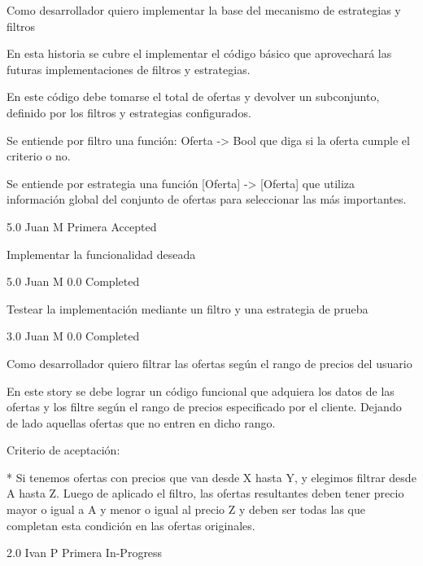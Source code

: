 	{Como desarrollador quiero implementar la base del mecanismo de estrategias y filtros} %
	{En esta historia se cubre el implementar el código básico que aprovechará las
futuras implementaciones de filtros y estrategias.

  

En este código debe tomarse el total de ofertas y devolver un subconjunto,
definido por los filtros y estrategias configurados.

  

Se entiende por filtro una función: Oferta -> Bool que diga si la oferta
cumple el criterio o no.

Se entiende por estrategia una función [Oferta] -> [Oferta] que utiliza
información global del conjunto de ofertas para seleccionar las más
importantes.

} %
	{} %
	{5.0} %
	{Juan M} %
	{Primera} %
	{Accepted} %

		{Implementar la funcionalidad deseada} %
		{

} %
		{5.0} %
		{Juan M} %
		{0.0} %
		{Completed} %

		{Testear la implementación mediante un filtro y una estrategia de prueba} %
		{

} %
		{3.0} %
		{Juan M} %
		{0.0} %
		{Completed} %


\vspace{20pt}

	{Como desarrollador quiero filtrar las ofertas según el rango de precios del usuario} %
	{En este story se debe lograr un código funcional que adquiera los datos de las
ofertas y los filtre según el rango de precios especificado por el cliente.
Dejando de lado aquellas ofertas que no entren en dicho rango.

  

Criterio de aceptación:

  

* Si tenemos ofertas con precios que van desde X hasta Y, y elegimos filtrar desde A hasta Z.  Luego de aplicado el filtro, las ofertas resultantes deben tener precio mayor o igual a A y menor o igual al precio Z y deben ser todas las que completan esta condición en las ofertas originales.

} %
	{} %
	{2.0} %
	{Ivan P} %
	{Primera} %
	{In-Progress} %

